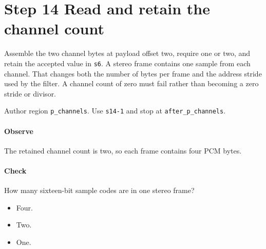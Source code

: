 \section{Step 14 Read and retain the channel count}\label{pcm-wav-s14}
Assemble the two channel bytes at payload offset two, require one or two, and retain the accepted value in \texttt{s6}. A stereo frame contains one sample from each channel. That changes both the number of bytes per frame and the address stride used by the filter. A channel count of zero must fail rather than becoming a zero stride or divisor.

Author region \texttt{p\_channels}. Use \texttt{s14-1} and stop at \texttt{after\_p\_channels}.

\paragraph{Observe} The retained channel count is two, so each frame contains four PCM bytes.

\paragraph{Check} How many sixteen-bit sample codes are in one stereo frame?
\begin{itemize}
  \item[A.] Four.
  \item[B.] Two.
  \item[C.] One.
\end{itemize}
